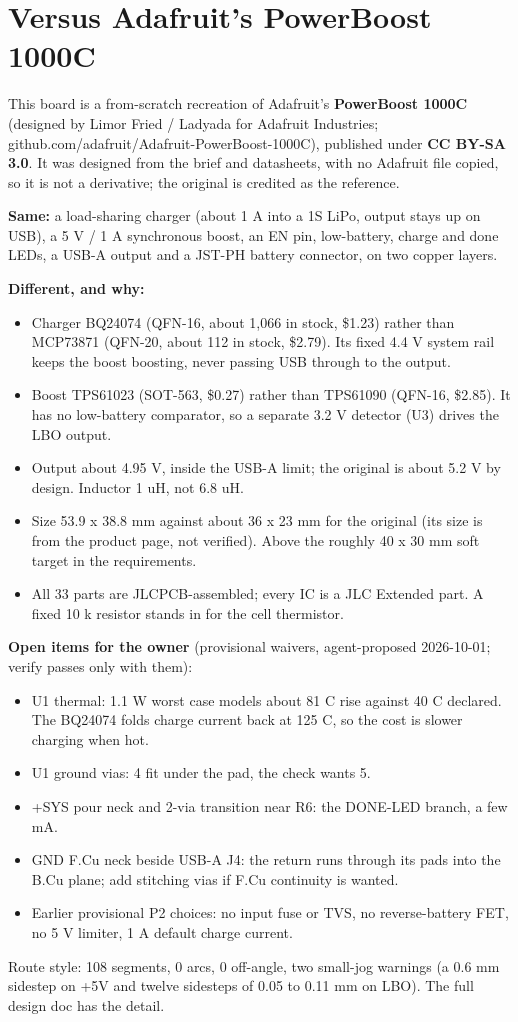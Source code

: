 \documentclass[11pt]{article}
\begin{document}
\section{Versus Adafruit's PowerBoost 1000C}
This board is a from-scratch recreation of Adafruit's \textbf{PowerBoost 1000C} (designed by Limor Fried / Ladyada for Adafruit Industries; github.com/adafruit/Adafruit-PowerBoost-1000C), published under \textbf{CC BY-SA 3.0}. It was designed from the brief and datasheets, with no Adafruit file copied, so it is not a derivative; the original is credited as the reference.

\textbf{Same:} a load-sharing charger (about 1 A into a 1S LiPo, output stays up on USB), a 5 V / 1 A synchronous boost, an EN pin, low-battery, charge and done LEDs, a USB-A output and a JST-PH battery connector, on two copper layers.

\textbf{Different, and why:}
\begin{itemize}
\item Charger BQ24074 (QFN-16, about 1,066 in stock, \$1.23) rather than MCP73871 (QFN-20, about 112 in stock, \$2.79). Its fixed 4.4 V system rail keeps the boost boosting, never passing USB through to the output.
\item Boost TPS61023 (SOT-563, \$0.27) rather than TPS61090 (QFN-16, \$2.85). It has no low-battery comparator, so a separate 3.2 V detector (U3) drives the LBO output.
\item Output about 4.95 V, inside the USB-A limit; the original is about 5.2 V by design. Inductor 1 uH, not 6.8 uH.
\item Size 53.9 x 38.8 mm against about 36 x 23 mm for the original (its size is from the product page, not verified). Above the roughly 40 x 30 mm soft target in the requirements.
\item All 33 parts are JLCPCB-assembled; every IC is a JLC Extended part. A fixed 10 k resistor stands in for the cell thermistor.
\end{itemize}

\textbf{Open items for the owner} (provisional waivers, agent-proposed 2026-10-01; verify passes only with them):
\begin{itemize}
\item U1 thermal: 1.1 W worst case models about 81 C rise against 40 C declared. The BQ24074 folds charge current back at 125 C, so the cost is slower charging when hot.
\item U1 ground vias: 4 fit under the pad, the check wants 5.
\item +SYS pour neck and 2-via transition near R6: the DONE-LED branch, a few mA.
\item GND F.Cu neck beside USB-A J4: the return runs through its pads into the B.Cu plane; add stitching vias if F.Cu continuity is wanted.
\item Earlier provisional P2 choices: no input fuse or TVS, no reverse-battery FET, no 5 V limiter, 1 A default charge current.
\end{itemize}
Route style: 108 segments, 0 arcs, 0 off-angle, two small-jog warnings (a 0.6 mm sidestep on +5V and twelve sidesteps of 0.05 to 0.11 mm on LBO). The full design doc has the detail.
\end{document}
